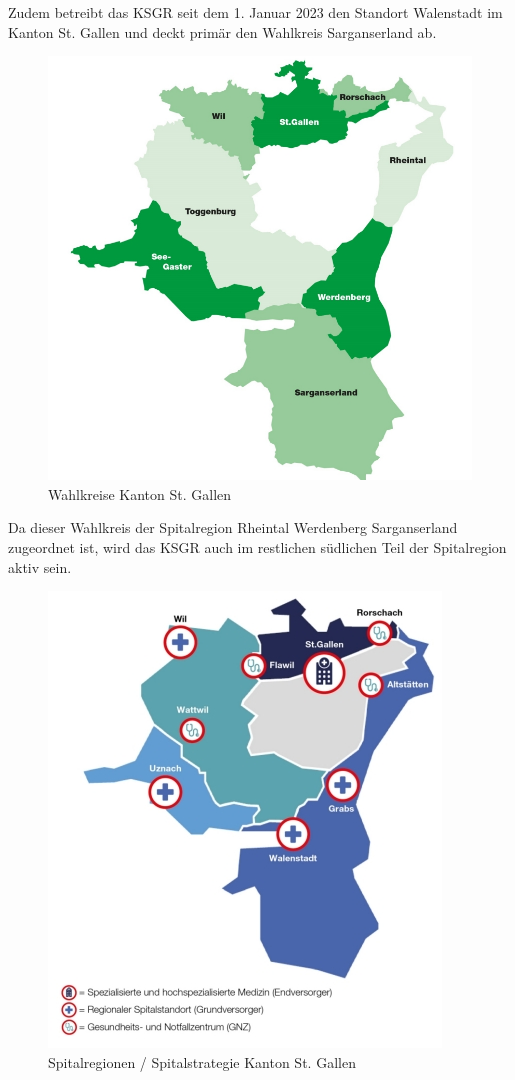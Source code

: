 \begin{flushleft}
    Zudem betreibt das KSGR seit dem 1. Januar 2023 den Standort Walenstadt im Kanton St. Gallen und deckt primär den Wahlkreis Sarganserland ab.
    \begin{figure}[H]
        \centering
        \includegraphics[width=0.75\linewidth]{source/introduction/initial_situation/sg_wahlkreise}
        \caption{Wahlkreise Kanton St. Gallen\cite{LEZ4SPDD}}
        \label{fig:sg_wahlkreise}
    \end{figure}
\end{flushleft}
\begin{flushleft}
    Da dieser Wahlkreis der Spitalregion Rheintal Werdenberg Sarganserland zugeordnet ist, wird das KSGR auch im restlichen südlichen Teil der Spitalregion aktiv sein.
    \begin{figure}[H]
        \centering
        \includegraphics[width=0.5\linewidth]{source/introduction/initial_situation/sg_spitalregionen}
        \caption{Spitalregionen / Spitalstrategie Kanton St. Gallen\cite{3L8EIPUP}}
        \label{fig:sg_spitalregionen}
    \end{figure}
\end{flushleft}
